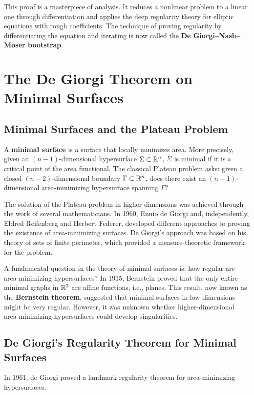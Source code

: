 This proof is a masterpiece of analysis. It reduces a nonlinear problem to a linear one through differentiation and applies the deep regularity theory for elliptic equations with rough coefficients. The technique of proving regularity by differentiating the equation and iterating is now called the \textbf{De Giorgi--Nash--Moser bootstrap}.

\section{The De Giorgi Theorem on Minimal Surfaces}

\subsection{Minimal Surfaces and the Plateau Problem}

A \textbf{minimal surface} is a surface that locally minimizes area. More precisely, given an \((n-1)\)-dimensional hypersurface \(\Sigma \subset \mathbb{R}^n\), \(\Sigma\) is minimal if it is a critical point of the area functional. The classical Plateau problem asks: given a closed \((n-2)\)-dimensional boundary \(\Gamma \subset \mathbb{R}^n\), does there exist an \((n-1)\)-dimensional area-minimizing hypersurface spanning \(\Gamma\)?

The solution of the Plateau problem in higher dimensions was achieved through the work of several mathematicians. In 1960, Ennio de Giorgi and, independently, Eldred Reifenberg and Herbert Federer, developed different approaches to proving the existence of area-minimizing surfaces. De Giorgi's approach was based on his theory of sets of finite perimeter, which provided a measure-theoretic framework for the problem.

A fundamental question in the theory of minimal surfaces is: how regular are area-minimizing hypersurfaces? In 1915, Bernstein proved that the only entire minimal graphs in \(\mathbb{R}^3\) are affine functions, i.e., planes. This result, now known as the \textbf{Bernstein theorem}, suggested that minimal surfaces in low dimensions might be very regular. However, it was unknown whether higher-dimensional area-minimizing hypersurfaces could develop singularities.

\subsection{De Giorgi's Regularity Theorem for Minimal Surfaces}

In 1961, de Giorgi proved a landmark regularity theorem for area-minimizing hypersurfaces.

